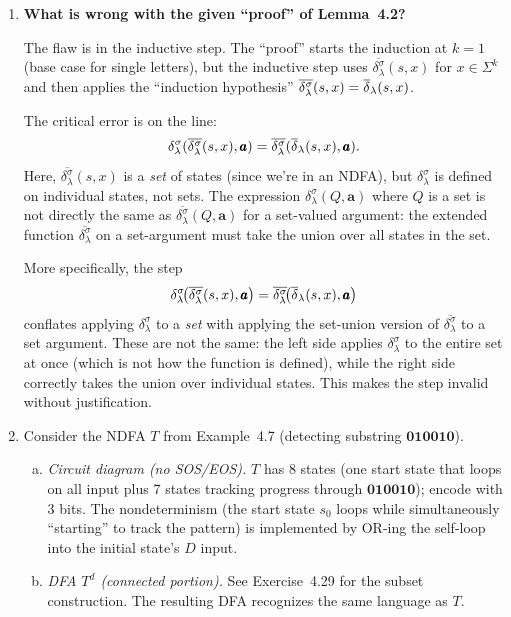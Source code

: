 \begin{enumerate}[{4.}1.]
\item \textbf{What is wrong with the given ``proof'' of Lemma~4.2?}

The flaw is in the inductive step.  The ``proof'' starts the induction at $k=1$
(base case for single letters), but the inductive step uses
$\overline{\delta^{\sigma}_\lambda}(s,x)$ for $x\in\Sigma^k$ and then applies
the ``induction hypothesis'' $\overline{\delta^{\sigma}_\lambda}(s,x)=\overline{\delta}_\lambda(s,x)$.

The critical error is on the line:
\[
  \delta^{\sigma}_\lambda(\overline{\delta^{\sigma}_\lambda}(s,x),\pmb{a})
  = \overline{\delta^{\sigma}_\lambda}(\overline{\delta}_\lambda(s,x),\pmb{a}).
\]
Here, $\overline{\delta^{\sigma}_\lambda}(s,x)$ is a \emph{set} of states
(since we're in an NDFA), but $\delta^{\sigma}_\lambda$ is defined on individual
states, not sets.  The expression $\delta^{\sigma}_\lambda(Q,\pmb{a})$ where
$Q$ is a set is not directly the same as $\overline{\delta^{\sigma}_\lambda}(Q,\pmb{a})$
for a set-valued argument: the extended function $\overline{\delta^{\sigma}_\lambda}$
on a set-argument must take the union over all states in the set.

More specifically, the step
\[
  \delta^{\sigma}_\lambda\!\bigl(\overline{\delta^{\sigma}_\lambda}(s,x),\pmb{a}\bigr)
  = \overline{\delta^{\sigma}_\lambda}\!\bigl(\overline{\delta}_\lambda(s,x),\pmb{a}\bigr)
\]
conflates applying $\delta^{\sigma}_\lambda$ to a \emph{set} with applying the
set-union version of $\overline{\delta^{\sigma}_\lambda}$ to a set argument.  These
are not the same: the left side applies $\delta^{\sigma}_\lambda$ to the entire
set at once (which is not how the function is defined), while the right side
correctly takes the union over individual states.  This makes the step invalid
without justification.

\item Consider the NDFA $T$ from Example~4.7 (detecting substring $\pmb{010010}$).

\begin{enumerate}[(a)]
  \item \emph{Circuit diagram (no SOS/EOS).}  $T$ has 8 states (one start
  state that loops on all input plus 7 states tracking progress through
  $\pmb{010010}$); encode with 3 bits.  The nondeterminism (the start state
  $s_0$ loops while simultaneously ``starting'' to track the pattern)
  is implemented by OR-ing the self-loop into the initial state's $D$ input.

  \item \emph{DFA $T^d$ (connected portion).}  See Exercise~4.29 for the
  subset construction.  The resulting DFA recognizes the same language as $T$.
\end{enumerate}


\end{enumerate}
